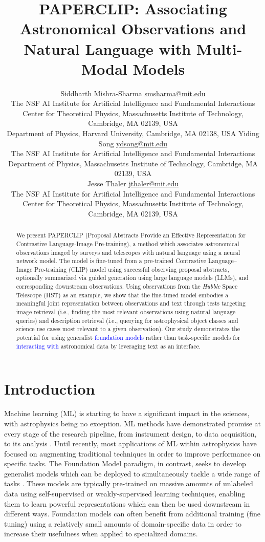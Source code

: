 \documentclass[10pt]{article} %
\title{\textsc{PAPERCLIP}: Associating Astronomical Observations and Natural Language with Multi-Modal Models}
\author{\name Siddharth Mishra-Sharma \email \href{mailto:smsharma@mit.edu}{smsharma@mit.edu} \\
      \addr The NSF AI Institute for Artificial Intelligence and Fundamental Interactions\\
      Center for Theoretical Physics, Massachusetts Institute of Technology, Cambridge, MA 02139, USA \\
      Department of Physics, Harvard University, Cambridge, MA 02138, USA
      \AND
      \name Yiding Song \email \href{mailto:ydsong@mit.edu}{ydsong@mit.edu} \\
      \addr The NSF AI Institute for Artificial Intelligence and Fundamental Interactions\\
      Department of Physics, Massachusetts Institute of Technology, Cambridge, MA 02139, USA \\
      \AND
      \name Jesse Thaler \email \href{mailto:jthaler@mit.edu}{jthaler@mit.edu} \\
      \addr The NSF AI Institute for Artificial Intelligence and Fundamental Interactions\\
      Center for Theoretical Physics, Massachusetts Institute of Technology, Cambridge, MA 02139, USA \\
}
\newcommand{\githubmaster}{\href{https://www.github.com/smsharma/PAPERCLIP-Hubble}{\faGithub}\xspace}
\newcommand{\hubble}{\emph{Hubble}\xspace}
\newcommand{\SM}[1]{\textcolor{blue}{[SM: #1]}}
\newcommand{\changes}[1]{\textcolor{blue}{#1}}
\begin{document}
\maketitle

\thispagestyle{firstpage}

\begin{abstract}
We present PAPERCLIP (Proposal Abstracts Provide an Effective Representation for Contrastive Language-Image Pre-training), a method which associates astronomical observations imaged by surveys and telescopes with natural language  using a neural network model. The model is fine-tuned from a pre-trained Contrastive Language–Image Pre-training (CLIP) model using successful observing proposal abstracts, optionally summarized via guided generation using large language models (LLMs), and corresponding downstream observations. Using observations from the \hubble Space Telescope (HST) as an example, we show that the fine-tuned model embodies a meaningful joint representation between observations and text through tests targeting image retrieval (i.e., finding the most relevant observations using natural language queries) and description retrieval (i.e., querying for astrophysical object classes and science use cases most relevant to a given observation). Our study demonstrates the potential for using generalist \changes{foundation models} rather than task-specific models for \changes{interacting with} astronomical data by leveraging text as an interface. \githubmaster
\end{abstract}

\tableofcontents

\section{Introduction}
\label{sec:intro}


Machine learning (ML) is starting to have a significant impact in the sciences, with astrophysics being no exception.
%
ML methods have demonstrated promise at every stage of the research pipeline, from instrument design, to data acquisition, to its analysis \citep{huertas2022dawes}.
%
Until recently, most applications of ML within astrophysics have focused on augmenting traditional techniques in order to improve performance on specific tasks.
%
The {Foundation Model} paradigm, in contrast, seeks to develop generalist models which can be deployed to simultaneously tackle a wide range of tasks \citep{bommasani2021opportunities}.
%
These models are typically pre-trained on massive amounts of unlabeled data using self-supervised or weakly-supervised learning techniques, enabling them to learn powerful representations which can then be used downstream in different ways.
%
Foundation models can often benefit from additional training ({fine tuning}) using a relatively small amounts of domain-specific data in order to increase their usefulness when applied to specialized domains.
\end{document}
